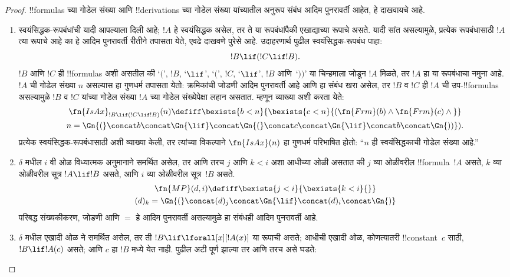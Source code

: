 \documentclass[../../../include/open-logic-section]{subfiles}
\begin{document}
\begin{proof}
!!{formula}s च्या गोडेल संख्या आणि !!{derivation}s च्या
गोडेल संख्या यांच्यातील अनुरूप संबंध आदिम पुनरावर्ती आहेत,
हे दाखवायचे आहे.
\begin{enumerate}
\item स्वयंसिद्धक-रूपबंधांची यादी आपल्याला दिली आहे; $!A$ हे
  स्वयंसिद्धक असेल, तर ते या रूपबंधांपैकी एखाद्याच्या रूपाचे असते.
  यादी सांत असल्यामुळे, प्रत्येक रूपबंधासाठी $!A$ त्या रूपाचे
  आहे का हे आदिम पुनरावर्ती रीतीने तपासता येते, एवढे दाखवणे पुरेसे आहे.
  उदाहरणार्थ पुढील स्वयंसिद्धक-रूपबंध पाहा:
  \[
  !B \lif (!C \lif !B).
  \]
  $!B$ आणि $!C$ ही !!{formula}s अशी असतील की `$($', $!B$,
  `$\lif$', `$($', $!C$, `$\lif$', $!B$ आणि~`$))$' या
  चिन्हमाला जोडून $!A$ मिळते, तर $!A$ हा या रूपबंधाचा नमुना आहे.
  $!A$ ची गोडेल संख्या $n$ असल्यास हा गुणधर्म तपासता येतो:
  क्रमिकांची जोडणी आदिम पुनरावर्ती आहे आणि हा संबंध खरा असेल,
  तर $!B$ व $!C$ ही $!A$ ची उप-!!{formula}s असल्यामुळे $!B$ व $!C$
  यांच्या गोडेल संख्या $!A$ च्या गोडेल संख्येपेक्षा लहान असतात.
  म्हणून व्याख्या अशी करता येते:
  \begin{multline*}
  \fn{IsAx}_{!B \lif (!C \lif !B)}(n) \defiff \bexists{b< n}{
    \bexists{c < n}{(\fn{Frm}(b) \land \fn{Frm}(c) \land {}}}\\ n =
  \Gn{(} \concat b \concat \Gn{\lif} \concat \Gn{(} \concat c \concat
  \Gn{\lif} \concat b \concat \Gn{))}).
  \end{multline*}
  प्रत्येक स्वयंसिद्धक-रूपबंधासाठी अशी व्याख्या केली, तर
  त्यांच्या विकल्पाने $\fn{IsAx}(n)$ हा गुणधर्म परिभाषित होतो:
  ``$n$ ही स्वयंसिद्धकाची गोडेल संख्या आहे.''
\item $\delta$ मधील $i$ वी ओळ विध्यात्मक अनुमानाने समर्थित असेल,
  तर आणि तरच $j$ आणि $k < i$ अशा आधीच्या ओळी असतात की
  $j$ व्या ओळीवरील !!{formula}~$!A$ असते,
  $k$ व्या ओळीवरील सूत्र $!A \lif !B$ असते, आणि
  $i$ व्या ओळीवरील सूत्र~$!B$ असते.
  \begin{multline*}
    \fn{MP}(d, i) \defiff \bexists{j < i}{\bexists{k < i}{}}\\
    (d)_k = \Gn{(} \concat (d)_j
      \concat \Gn{\lif} \concat (d)_i \concat \Gn{)}
  \end{multline*}
  परिबद्ध संख्यकीकरण, जोडणी आणि $=$ हे आदिम पुनरावर्ती
  असल्यामुळे हा संबंधही आदिम पुनरावर्ती आहे.
\item $\delta$ मधील एखादी ओळ \QR{} ने समर्थित असेल,
  तर ती $!B \lif \lforall[x][!A(x)]$ या रूपाची असते;
  आधीची एखादी ओळ, कोणत्यातरी !!{constant}~$c$ साठी,
  $!B \lif !A(c)$ असते; आणि $c$ हा $!B$ मध्ये येत नाही.
  पुढील अटी पूर्ण झाल्या तर आणि तरच असे घडते:

\end{enumerate}
\end{proof}
\end{document}
